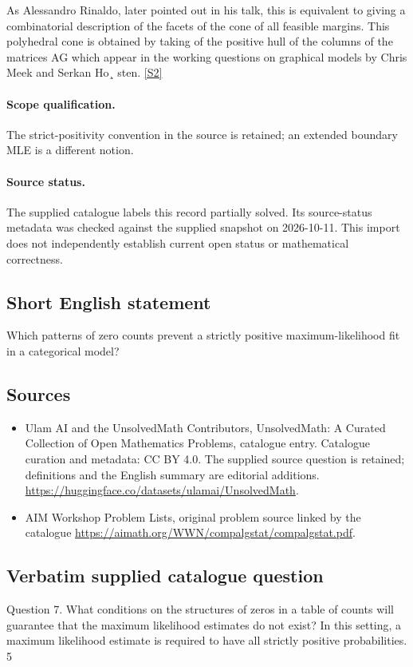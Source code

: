 \documentclass[11pt]{article}
\begin{document}
As Alessandro Rinaldo, later pointed out in his talk, this is equivalent to giving a combinatorial description of the facets of the cone of all feasible margins. This polyhedral cone is obtained by taking of the positive hull of the columns of the matrices AG which appear in the working questions on graphical models by Chris Meek and Serkan Ho¸ sten. \href{https://aimath.org/WWN/compalgstat/compalgstat.pdf}{[S2]}
\paragraph{Scope qualification.}
The strict-positivity convention in the source is retained; an extended boundary MLE is a different notion.
\paragraph{Source status.}
The supplied catalogue labels this record partially solved. Its source-status metadata was checked against the supplied snapshot on 2026-10-11. This import does not independently establish current open status or mathematical correctness.
\subsection{Short English statement}
Which patterns of zero counts prevent a strictly positive maximum-likelihood fit in a categorical model?
\subsection{Sources}
\begin{itemize}
\item[S1] Ulam AI and the UnsolvedMath Contributors, UnsolvedMath: A Curated Collection of Open Mathematics Problems, catalogue entry. Catalogue curation and metadata: CC BY 4.0. The supplied source question is retained; definitions and the English summary are editorial additions.
\url{https://huggingface.co/datasets/ulamai/UnsolvedMath}.
\item[S2] AIM Workshop Problem Lists, original problem source linked by the catalogue
\url{https://aimath.org/WWN/compalgstat/compalgstat.pdf}.
\end{itemize}
\subsection{Verbatim supplied catalogue question}
Question 7. What conditions on the structures of zeros in a table of counts will guarantee that the maximum likelihood estimates do not exist? In this setting, a maximum likelihood estimate is required to have all strictly positive probabilities. 5
\end{document}

